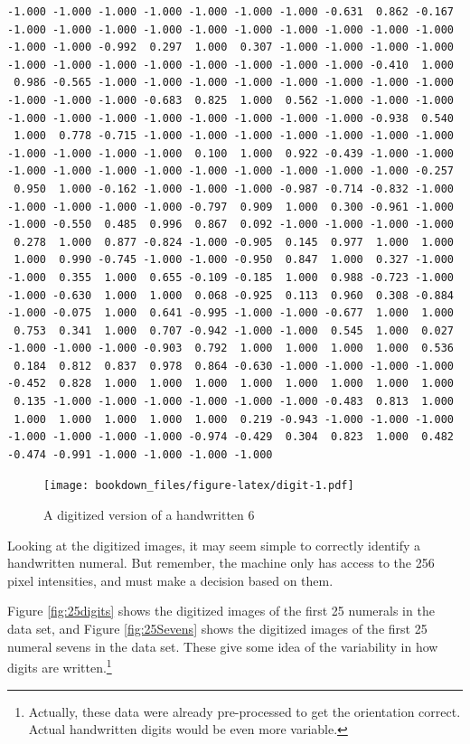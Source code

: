 \documentclass[
]{krantz}
\begin{document}
\begin{verbatim}
-1.000 -1.000 -1.000 -1.000 -1.000 -1.000 -1.000 -0.631  0.862 -0.167 
-1.000 -1.000 -1.000 -1.000 -1.000 -1.000 -1.000 -1.000 -1.000 -1.000 
-1.000 -1.000 -0.992  0.297  1.000  0.307 -1.000 -1.000 -1.000 -1.000 
-1.000 -1.000 -1.000 -1.000 -1.000 -1.000 -1.000 -1.000 -0.410  1.000 
 0.986 -0.565 -1.000 -1.000 -1.000 -1.000 -1.000 -1.000 -1.000 -1.000 
-1.000 -1.000 -1.000 -0.683  0.825  1.000  0.562 -1.000 -1.000 -1.000 
-1.000 -1.000 -1.000 -1.000 -1.000 -1.000 -1.000 -1.000 -0.938  0.540 
 1.000  0.778 -0.715 -1.000 -1.000 -1.000 -1.000 -1.000 -1.000 -1.000 
-1.000 -1.000 -1.000 -1.000  0.100  1.000  0.922 -0.439 -1.000 -1.000 
-1.000 -1.000 -1.000 -1.000 -1.000 -1.000 -1.000 -1.000 -1.000 -0.257 
 0.950  1.000 -0.162 -1.000 -1.000 -1.000 -0.987 -0.714 -0.832 -1.000 
-1.000 -1.000 -1.000 -1.000 -0.797  0.909  1.000  0.300 -0.961 -1.000 
-1.000 -0.550  0.485  0.996  0.867  0.092 -1.000 -1.000 -1.000 -1.000 
 0.278  1.000  0.877 -0.824 -1.000 -0.905  0.145  0.977  1.000  1.000 
 1.000  0.990 -0.745 -1.000 -1.000 -0.950  0.847  1.000  0.327 -1.000 
-1.000  0.355  1.000  0.655 -0.109 -0.185  1.000  0.988 -0.723 -1.000 
-1.000 -0.630  1.000  1.000  0.068 -0.925  0.113  0.960  0.308 -0.884 
-1.000 -0.075  1.000  0.641 -0.995 -1.000 -1.000 -0.677  1.000  1.000 
 0.753  0.341  1.000  0.707 -0.942 -1.000 -1.000  0.545  1.000  0.027 
-1.000 -1.000 -1.000 -0.903  0.792  1.000  1.000  1.000  1.000  0.536 
 0.184  0.812  0.837  0.978  0.864 -0.630 -1.000 -1.000 -1.000 -1.000 
-0.452  0.828  1.000  1.000  1.000  1.000  1.000  1.000  1.000  1.000 
 0.135 -1.000 -1.000 -1.000 -1.000 -1.000 -1.000 -0.483  0.813  1.000 
 1.000  1.000  1.000  1.000  1.000  0.219 -0.943 -1.000 -1.000 -1.000 
-1.000 -1.000 -1.000 -1.000 -0.974 -0.429  0.304  0.823  1.000  0.482 
-0.474 -0.991 -1.000 -1.000 -1.000 -1.000 
\end{verbatim}

\begin{figure}
\centering
\texttt{[image: bookdown\_files/figure-latex/digit-1.pdf]}
\caption{\label{fig:digit}A digitized version of a handwritten 6}
\end{figure}

Looking at the digitized images, it may seem simple to correctly identify a handwritten numeral. But remember, the machine only has access to the 256 pixel intensities, and must make a decision based on them.

Figure \ref{fig:25digits} shows the digitized images of the first 25 numerals in the data set, and Figure \ref{fig:25Sevens} shows the digitized images of the first 25 numeral sevens in the data set. These give some idea of the variability in how digits are written.\footnote{Actually, these data were already pre-processed to get the orientation correct. Actual handwritten digits would be even more variable.}
\end{document}

